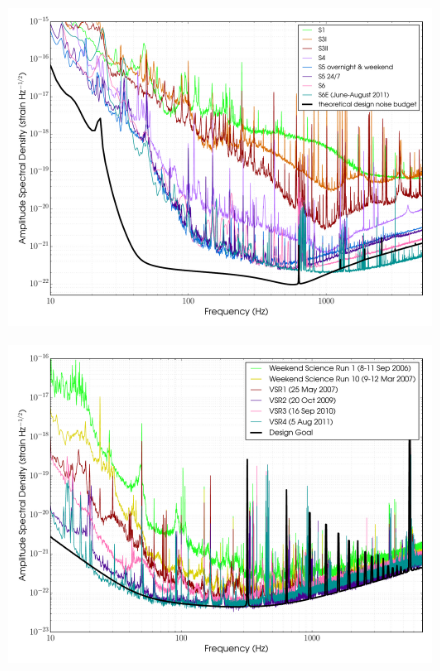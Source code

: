 \begin{figure}[]
\begin{center}
\includegraphics[width=1\columnwidth]{./figures/GEOSrunASDs/GEOSrunASDs}
\caption{ \protect}
\end{center}
\end{figure}


\begin{figure}[]
\begin{center}
\includegraphics[width=1\columnwidth]{./figures/VirgoSrunASDs/VirgoSrunASDs}
\caption{ \protect}
\end{center}
\end{figure}


